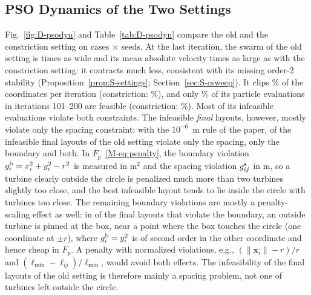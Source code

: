 \documentclass[10pt]{article}
\begin{document}
\subsection{PSO Dynamics of the Two Settings}
\label{sec:S-diag-pso}
Fig.~\ref{fig:D-psodyn} and Table~\ref{tab:D-psodyn} compare the old and the constriction setting on \NDDynCases{} cases $\times$ \NDDynSeeds{} seeds. At the last iteration, the swarm of the old setting is \NDSpreadRatio{} times as wide and its mean absolute velocity \NDVelRatio{} times as large as with the constriction setting: it contracts much less, consistent with its missing order-2 stability (Proposition~\ref{prop:S-settings}; Section~\ref{sec:S-csweep}). It clips \NDClipOld\% of the coordinates per iteration (constriction: \NDClipNew\%), and only \NDFeasPartOld\% of its particle evaluations in iterations 101--200 are feasible (constriction: \NDFeasPartNew\%). %
Most of its infeasible evaluations violate both constraints. The infeasible \emph{final} layouts, however, mostly violate only the spacing constraint: with the $10^{-6}$~m rule of the paper, \NDStoredSpacingOnlyOld{} of the \NDStoredInfeasOld{} infeasible final layouts of the old setting violate only the spacing, \NDStoredBoundOnlyOld{} only the boundary and \NDStoredBothOld{} both. In $F_p$~\eqref{M-eq:penalty}, the boundary violation $g^{\rm b}_i=x_i^2+y_i^2-r^2$ is measured in m$^2$ and the spacing violation $g^{\rm s}_{ij}$ in m, so a turbine clearly outside the circle is penalized much more than two turbines slightly too close, and the best infeasible layout tends to lie inside the circle with turbines too close. The remaining boundary violations are mostly a penalty-scaling effect as well: in \NDStoredTangentOld{} of the \NDStoredAnyBoundOld{} final layouts that violate the boundary, an outside turbine is pinned at the box, near a point where the box touches the circle (one coordinate at $\pm r$), where $g^{\rm b}_i=y_i^2$ is of second order in the other coordinate and hence cheap in $F_p$. A penalty with normalized violations, e.g., $(\lVert\mathbf x_i\rVert-r)/r$ and $(\ell_{\min}-\ell_{ij})/\ell_{\min}$, would avoid both effects. The infeasibility of the final layouts of the old setting is therefore mainly a spacing problem, not one of turbines left outside the circle. %
\end{document}
